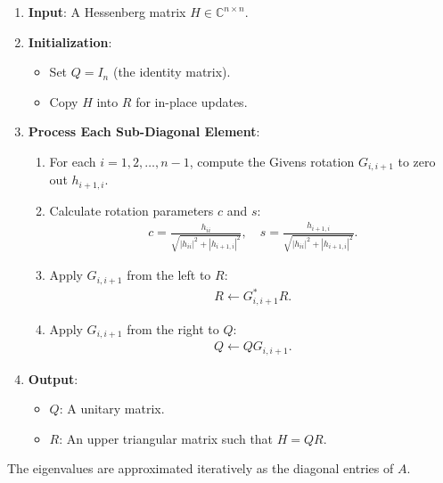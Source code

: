\documentclass[12pt]{article}
\numberwithin{equation}{subsubsection}
\begin{document}
\begin{enumerate}
	\item \textbf{Input}: A Hessenberg matrix $ H \in \mathbb{C}^{n \times n} $.
	          
	\item \textbf{Initialization}:
	      \begin{itemize}
	      	\item Set $ Q = I_n $ (the identity matrix).
	      	\item Copy $ H $ into $ R $ for in-place updates.
	      \end{itemize}
	          
	\item \textbf{Process Each Sub-Diagonal Element}:
	      \begin{enumerate}
	      	\item For each $ i = 1, 2, \dots, n-1 $, compute the Givens rotation $ G_{i, i+1} $ to zero out $ h_{i+1, i} $.
	      	\item Calculate rotation parameters $ c $ and $ s $:
	      	      \begin{align}
	      	      	c = \frac{h_{ii}}{\sqrt{|h_{ii}|^2 + |h_{i+1, i}|^2}}, \quad s = \frac{h_{i+1, i}}{\sqrt{|h_{ii}|^2 + |h_{i+1, i}|^2}}.
	      	      \end{align}
	      	\item Apply $ G_{i, i+1} $ from the left to $ R $:
	      	      \begin{align}
	      	      	R \gets G_{i, i+1}^* R.
	      	      \end{align}
	      	\item Apply $ G_{i, i+1} $ from the right to $ Q $:
	      	      \begin{align}
	      	      	Q \gets Q G_{i, i+1}.
	      	      \end{align}
	      \end{enumerate}
	          
	\item \textbf{Output}:
	      \begin{itemize}
	      	\item $ Q $: A unitary matrix.
	      	\item $ R $: An upper triangular matrix such that $ H = QR $.
	      \end{itemize}
\end{enumerate}

The eigenvalues are approximated iteratively as the diagonal entries of $ A $.
\end{document}
